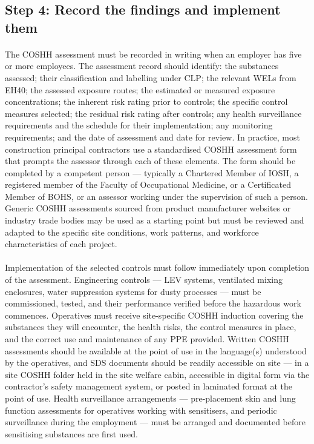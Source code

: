 \subsection{Step 4: Record the findings and implement them}

\paragraph{}
The COSHH assessment must be recorded in writing when an employer has five or more employees. The assessment record should identify: the substances assessed; their classification and labelling under CLP; the relevant WELs from EH40; the assessed exposure routes; the estimated or measured exposure concentrations; the inherent risk rating prior to controls; the specific control measures selected; the residual risk rating after controls; any health surveillance requirements and the schedule for their implementation; any monitoring requirements; and the date of assessment and date for review. In practice, most construction principal contractors use a standardised COSHH assessment form that prompts the assessor through each of these elements. The form should be completed by a competent person — typically a Chartered Member of IOSH, a registered member of the Faculty of Occupational Medicine, or a Certificated Member of BOHS, or an assessor working under the supervision of such a person. Generic COSHH assessments sourced from product manufacturer websites or industry trade bodies may be used as a starting point but must be reviewed and adapted to the specific site conditions, work patterns, and workforce characteristics of each project.

\paragraph{}
Implementation of the selected controls must follow immediately upon completion of the assessment. Engineering controls — LEV systems, ventilated mixing enclosures, water suppression systems for dusty processes — must be commissioned, tested, and their performance verified before the hazardous work commences. Operatives must receive site-specific COSHH induction covering the substances they will encounter, the health risks, the control measures in place, and the correct use and maintenance of any PPE provided. Written COSHH assessments should be available at the point of use in the language(s) understood by the operatives, and SDS documents should be readily accessible on site — in a site COSHH folder held in the site welfare cabin, accessible in digital form via the contractor's safety management system, or posted in laminated format at the point of use. Health surveillance arrangements — pre-placement skin and lung function assessments for operatives working with sensitisers, and periodic surveillance during the employment — must be arranged and documented before sensitising substances are first used.

